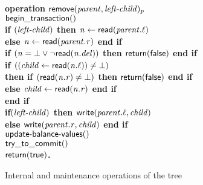 \begin{figure}[h!]
{{\begin{minipage}[t]{150mm}
\begin{tabbing}
		
\bf{operation} $\act{remove}(\ms{parent}, \ms{left-child})_p$ \\
		 \> $\lit{begin\_transaction}()$ \\
		 \> \bf{if} $(\ms{left-child})$ \bf{then} $\ms{n} \gets \lit{read}(\ms{parent.\ell})$ \\
		 \>\> \bf{else} $\ms{n} \gets \lit{read}(\ms{parent.r})$ \bf{end if} \\
		 \> \bf{if} $(\ms{n = \bot} \vee \neg\lit{read}(\ms{n.del}))$ \bf{then} ${\sf return}(\lit{false})$ \bf{end if} \\	
		 \> \bf{if} $((\ms{child} \gets \lit{read}(\ms{n.\ell})) \neq \bot)$ \\
		 \>\> \bf{then if} $(\lit{read}(\ms{n.r}) \neq \bot)$ \bf{then} ${\sf return}(\lit{false})$ \bf{end if} \\%
		 \>\> \bf{else} $\ms{child} \gets \lit{read}(\ms{n.r})$ {\bf end if} \\
		 \> \bf{end if} \\
		 \> \bf{if}$(\ms{left-child})$ \bf{then} $\lit{write}(\ms{parent.\ell}, \ms{child})$ \\%
		 \>\> \bf{else} $\lit{write}(\ms{parent.r}, \ms{child})$ \bf{end if} \\%
		 \> $\act{update-balance-values()}$ \\%
		 \> $\lit{try\_to\_commit}()$ \\
		 \> $\sf{return}(\lit{true})$. \\
		
		

\end{tabbing}
\normalsize
\end{minipage}
}
\caption{Internal and maintenance operations of the tree}
\label{fig:tree-maintenance}
}
\end{figure}